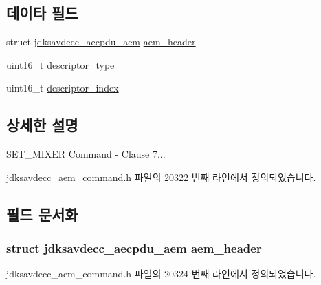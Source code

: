 \subsection*{데이타 필드}
\begin{DoxyCompactItemize}
\item 
struct \hyperlink{structjdksavdecc__aecpdu__aem}{jdksavdecc\+\_\+aecpdu\+\_\+aem} \hyperlink{structjdksavdecc__aem__command__set__mixer_ae1e77ccb75ff5021ad923221eab38294}{aem\+\_\+header}
\item 
uint16\+\_\+t \hyperlink{structjdksavdecc__aem__command__set__mixer_ab7c32b6c7131c13d4ea3b7ee2f09b78d}{descriptor\+\_\+type}
\item 
uint16\+\_\+t \hyperlink{structjdksavdecc__aem__command__set__mixer_a042bbc76d835b82d27c1932431ee38d4}{descriptor\+\_\+index}
\end{DoxyCompactItemize}


\subsection{상세한 설명}
S\+E\+T\+\_\+\+M\+I\+X\+ER Command -\/ Clause 7... 

jdksavdecc\+\_\+aem\+\_\+command.\+h 파일의 20322 번째 라인에서 정의되었습니다.



\subsection{필드 문서화}
\subsubsection[{\texorpdfstring{aem\+\_\+header}{aem_header}}]{\setlength{\rightskip}{0pt plus 5cm}struct {\bf jdksavdecc\+\_\+aecpdu\+\_\+aem} aem\+\_\+header}\hypertarget{structjdksavdecc__aem__command__set__mixer_ae1e77ccb75ff5021ad923221eab38294}{}\label{structjdksavdecc__aem__command__set__mixer_ae1e77ccb75ff5021ad923221eab38294}


jdksavdecc\+\_\+aem\+\_\+command.\+h 파일의 20324 번째 라인에서 정의되었습니다.

